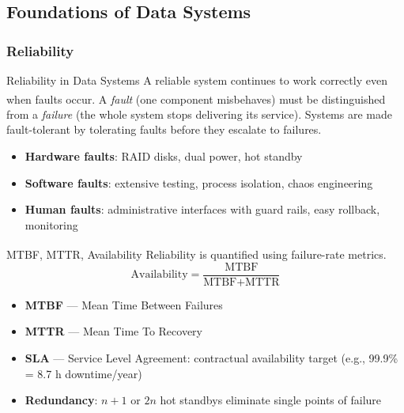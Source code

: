 \subsection{Foundations of Data Systems}

\subsubsection{Reliability}

\begin{v3topic}{Reliability in Data Systems}
    A reliable system continues to work correctly even when faults occur\textsuperscript{\cite{gujaStartingDataAnalytics2025}}.
    A \emph{fault} (one component misbehaves) must be distinguished from a \emph{failure} (the whole system stops delivering its service).
    Systems are made fault-tolerant by tolerating faults before they escalate to failures.
\visualseparator
    \begin{itemize}
        \item \textbf{Hardware faults}: RAID disks, dual power, hot standby
        \item \textbf{Software faults}: extensive testing, process isolation, chaos engineering
        \item \textbf{Human faults}: administrative interfaces with guard rails, easy rollback, monitoring
    \end{itemize}

\end{v3topic}
\begin{v3topic}{MTBF, MTTR, Availability}
    Reliability is quantified using failure-rate metrics\textsuperscript{\cite{gujaStartingDataAnalytics2025}}.
    \begin{equation}
        \text{Availability} = \frac{\text{MTBF}}{\text{MTBF} + \text{MTTR}}
    \end{equation}
    \begin{itemize}
        \item \textbf{MTBF} — Mean Time Between Failures
        \item \textbf{MTTR} — Mean Time To Recovery
        \item \textbf{SLA} — Service Level Agreement: contractual availability target (e.g., 99.9\% = 8.7 h downtime/year)
        \item \textbf{Redundancy}: $n+1$ or $2n$ hot standbys eliminate single points of failure
    \end{itemize}
\end{v3topic}

